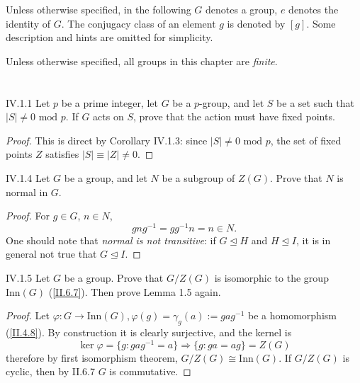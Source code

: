 Unless otherwise specified, in the following $G$ denotes a group, $e$ denotes the identity of $G$. The conjugacy class of an element $g$ is denoted by $[g]$. Some description and hints are omitted for simplicity.

Unless otherwise specified, all groups in this chapter are \emph{finite}.

\section{}


\begin{problem}{IV.1.1}
Let $p$ be a prime integer, let $G$ be a $p$-group, and let $S$ be a set such that $|S| \neq 0 \text{ mod } p$. If $G$ acts on $S$, prove that the action must have fixed points.
\end{problem}
\begin{proof}
This is direct by Corollary IV.1.3: since $|S| \neq 0 \text{ mod }p $, the set of fixed points $Z$ satisfies $|S| \equiv |Z| \neq 0$.	
\end{proof}

\begin{problem}{IV.1.4}
Let $G$ be a group, and let $N$ be a subgroup of $Z(G)$. Prove that $N$ is normal in $G$. 	
\end{problem}
\begin{proof}
For $g \in G$, $n \in N$,
\[
gng^{-1} = gg^{-1}n = n \in N.
\]
One should note that \emph{normal is not transitive}: if $G \unlhd H$ and $H \unlhd I$, it is in general not true that $G \unlhd I$.
\end{proof}

\begin{problem}{IV.1.5}
Let $G$ be a group. Prove that $G/Z(G)$ is isomorphic to the group $\text{Inn}(G)$ (\ref{II.6.7}). Then prove Lemma 1.5 again.
\end{problem}
\begin{proof}
Let $\varphi : G \to \text{Inn}(G), \varphi(g) = \gamma_g(a) := gag^{-1}$ be a homomorphism (\ref{II.4.8}). By construction it is clearly surjective, and the kernel is
\[
\ker \varphi = \{g: gag^{-1} = a\} \Rightarrow \{g : ga = ag \}	= Z(G)
\]
therefore by first isomorphism theorem, $G/Z(G) \cong \text{Inn}(G)$. If $G/Z(G)$ is cyclic, then by II.6.7 $G$ is commutative.
\end{proof}

